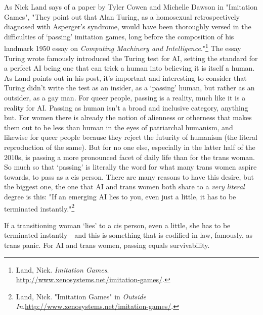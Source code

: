 \documentclass[10pt, statementpaper, twoside, openright]{memoir}
\begin{document}
As Nick Land says of a paper by Tyler Cowen and Michelle Dawson in "Imitation Games", "They point out that Alan Turing, as a homosexual retrospectively diagnosed with Asperger's syndrome, would have been thoroughly versed in the difficulties of ‘passing' imitation games, long before the composition of his landmark 1950 essay on \textit{Computing Machinery and Intelligence}."\footnote{Land, Nick. \textit{Imitation Games}.\\ \href{http://www.xenosystems.net/imitation-games/}{http://www.xenosystems.net/imitation-games/}.} The essay Turing wrote famously introduced the Turing test for AI, setting the standard for a perfect AI being one that can trick a human into believing it is itself a human. As Land points out in his post, it's important and interesting to consider that Turing didn't write the test as an insider, as a ‘passing' human, but rather as an outsider, as a gay man. For queer people, passing is a reality, much like it is a reality for AI. Passing as human isn't a broad and inclusive category, anything but. For women there is already the notion of alienness or otherness that makes them out to be less than human in the eyes of patriarchal humanism, and likewise for queer people because they reject the futurity of humanism (the literal reproduction of the same). But for no one else, especially in the latter half of the 2010s, is passing a more pronounced facet of daily life than for the trans woman. So much so that ‘passing' is literally the word for what many trans women aspire towards, to pass as a cis person. There are many reasons to have this desire, but the biggest one, the one that AI and trans women both share to a \textit{very literal} degree is this: "If an emerging AI lies to you, even just a little, it has to be terminated instantly."\footnote{Land, Nick. "Imitation Games" in \textit{Outside In}.\newline \href{http://www.xenosystems.net/imitation-games/}{http://www.xenosystems.net/imitation-games/}.}

If a transitioning woman ‘lies' to a cis person, even a little, she has to be terminated instantly---and this is something that is codified in law, famously, as trans panic. For AI and trans women, passing equals survivability.
\end{document}
